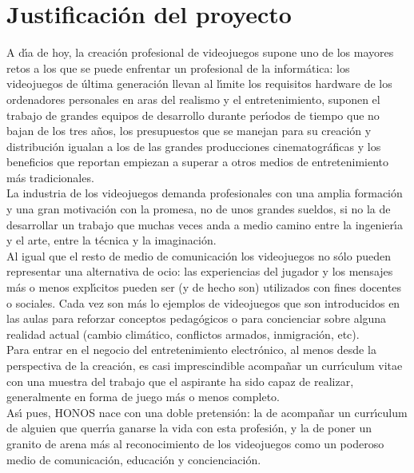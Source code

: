\section{Justificaci\'on del proyecto}
\label{sec:justificacion}

A d\'{\i}a de hoy, la creaci\'on profesional de videojuegos supone uno de los mayores retos a los que se puede enfrentar un profesional de la inform\'atica: los videojuegos de \'ultima generaci\'on llevan al l\'{\i}mite los requisitos hardware de los ordenadores personales en aras del realismo y el entretenimiento, suponen el trabajo de grandes equipos de desarrollo durante per\'{\i}odos de tiempo que no bajan de los tres a\~nos, los presupuestos que se manejan para su creaci\'on y distribuci\'on igualan a los de las grandes producciones cinematogr\'aficas y los beneficios que reportan empiezan a superar a otros medios de entretenimiento m\'as tradicionales.\\

La industria de los videojuegos demanda profesionales con una amplia formaci\'on y una gran motivaci\'on con la promesa, no de unos grandes sueldos, si no la de desarrollar un trabajo que muchas veces anda a medio camino entre la ingenier\'{\i}a y el arte, entre la t\'ecnica y la imaginaci\'on.\\

Al igual que el resto de medio de comunicaci\'on los videojuegos no s\'olo pueden representar una alternativa de ocio: las experiencias del jugador y los mensajes m\'as o menos expl\'{\i}citos pueden ser (y de hecho son) utilizados con fines docentes o sociales. Cada vez son m\'as lo ejemplos de videojuegos que son introducidos en las aulas para reforzar conceptos pedag\'ogicos o para concienciar sobre alguna realidad actual (cambio clim\'atico, conflictos armados, inmigraci\'on, etc).\\

Para entrar en el negocio del entretenimiento electr\'onico, al menos desde la perspectiva de la creaci\'on, es casi imprescindible acompa\~nar un curr\'{\i}culum vitae con una muestra del trabajo que el aspirante ha sido capaz de realizar, generalmente en forma de juego m\'as o menos completo.\\

As\'{\i} pues, HONOS nace con una doble pretensi\'on: la de acompa\~nar un curr\'{\i}culum de alguien que querr\'{\i}a ganarse la vida con esta profesi\'on, y la de poner un granito de arena m\'as al reconocimiento de los videojuegos como un poderoso medio de comunicaci\'on, educaci\'on y concienciaci\'on.\\
